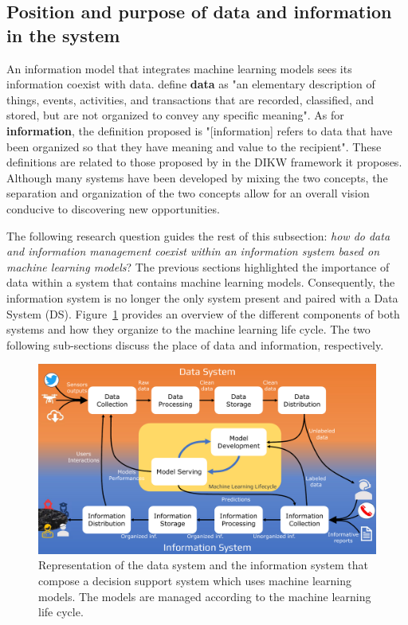 \subsection{Position and purpose of data and information in the system}
An information model that integrates machine learning models sees its information coexist with data.
\textcite{rainerIntroductionInformationSystems2021} define \textbf{data} as "an elementary description
of things, events, activities, and transactions that are recorded, classified, and stored,
but are not organized to convey any specific meaning".
As for \textbf{information}, the definition proposed is "[information] refers to data
that have been organized so that they have meaning and value to the recipient".
These definitions are related to those proposed by \textcite{ackoffDataWisdom1989} in the DIKW framework it proposes.
Although many systems have been developed by mixing the two concepts, the separation and organization of the two concepts allow for an overall vision conducive to discovering new opportunities.

The following research question guides the rest of this subsection: \textit{how do data and information management coexist within an information system based on machine learning models}?
The previous sections highlighted the importance of data within a system that contains machine learning models.
Consequently, the information system is no longer the only system present and paired with a Data System (DS).
Figure~\ref{system:ds-is-systems} provides an overview of the different components of both systems and how they organize to the machine learning life cycle.
The two following sub-sections discuss the place of data and information, respectively.

\begin{figure}[htb]
    \centering
    \includegraphics[width=\textwidth]{figures/chap-5/data-information-systems.pdf}
    \caption{Representation of the data system and the information system that compose a decision support system which uses machine learning models. The models are managed according to the machine learning life cycle.}
    \label{system:ds-is-systems}
\end{figure}

